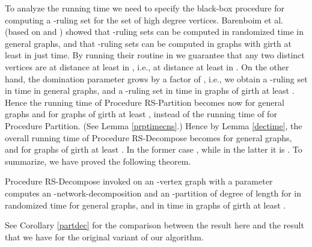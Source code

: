 \documentclass[11pt]{article}
\begin{document}
To analyze the running time we need to specify the black-box procedure for computing a -ruling set  for the set  of high degree vertices. Barenboim et al. \cite{BEPS12} (based on \cite{KP12} and \cite{BKP14}) showed that -ruling sets can be computed in  randomized time in general graphs, and that -ruling sets can be computed in graphs with girth at least  in just  time.
By running their routine in  we guarantee that any two distinct vertices  are at distance at least  in , i.e., at distance at least  in . On the other hand, the domination parameter grows by a factor of , i.e., we obtain a -ruling set in  time in general graphs, 
and a -ruling set in  time in graphs of girth at least . 
Hence the running time of Procedure RS-Partition becomes now  for general graphs and  for graphs of girth at least , instead of the running time of  for Procedure Partition. (See Lemma \ref{prptimecns}.) Hence by Lemma \ref{dectime}, the overall running time of Procedure RS-Decompose becomes  for general graphs, and  for graphs of girth at least .
In the former case , while in the latter it is . To summarize, we have proved the following theorem.
\begin{thm} \label{rsdecom}
Procedure RS-Decompose invoked on an -vertex graph  with a parameter  computes an -network-decomposition  and an -partition  of degree  of length  for  in  randomized time for general graphs, and in  time in graphs of girth at least .
\end{thm}
See Corollary \ref{partdec} for the comparison between the result here and the result that we have for the original variant of our algorithm.
\end{document}
